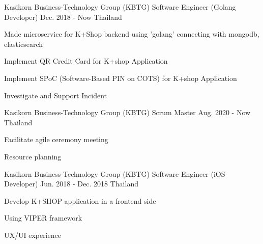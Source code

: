 

\begin{cventries}

  \cventry
    {Kasikorn Business-Technology Group (KBTG)} %
    {Software Engineer (Golang Developer)} %
    {Dec. 2018 - Now} %
    {Thailand} %
    {
      \begin{cvitems} %
        \item {Made microservice for K+Shop backend using 'golang' connecting with mongodb, elasticsearch}
        \item {Implement QR Credit Card for K+shop Application}
        \item {Implement SPoC (Software-Based PIN on COTS) for K+shop Application}
        \item {Investigate and Support Incident}
      \end{cvitems}
    }

  \cventry
    {Kasikorn Business-Technology Group (KBTG)} %
    {Scrum Master} %
    {Aug. 2020 - Now} %
    {Thailand} %
  {
    \begin{cvitems} %
      \item {Facilitate agile ceremony meeting} %
      \item {Resource planning}
    \end{cvitems}
  }

  \cventry
    {Kasikorn Business-Technology Group (KBTG)} %
    {Software Engineer (iOS Developer)} %
    {Jun. 2018 - Dec. 2018} %
    {Thailand} %
    {
      \begin{cvitems} %
        \item {Develop K+SHOP application in a frontend side}
        \item {Using VIPER framework}
        \item {UX/UI experience}
      \end{cvitems}
    }


\end{cventries}
